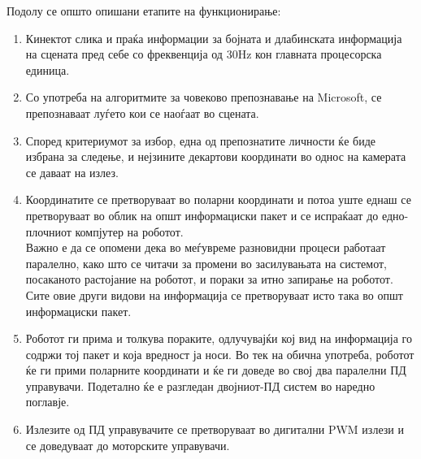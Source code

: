 \documentclass[12pt]{article}
\begin{document}
    Подолу се општо опишани етапите на функционирање:
    \renewcommand{\theenumii}{\arabic{enumii}}
    \renewcommand{\theenumiii}{\arabic{enumiii}}
    \begin{enumerate}
      \item Кинектот слика и праќа информации за бојната и длабинската информација на сцената пред себе со фреквенција од 30Hz кон главната процесорска единица.
      \item Со употреба на алгоритмите за човеково препознавање на Microsoft, се препознаваат луѓето кои се наоѓаат во сцената.
      \item Според критериумот за избор, една од препознатите личности ќе биде избрана за следење, и нејзините декартови координати во однос на камерата се даваат на излез.
      \item Координатите се претворуваат во поларни координати и потоа уште еднаш се претворуваат во облик на општ информациски пакет и се испраќаат до едно-плочниот компјутер на роботот.
      \\
      Важно е да се опомени дека во меѓувреме разновидни процеси работаат паралелно, како што се читачи за промени во засилувањата на системот, посаканото растојание на роботот, и пораки за итно запирање на роботот. Сите овие други видови на информација се претворуваат исто така во општ информациски пакет.
      \item Роботот ги прима и толкува пораките, одлучувајќи кој вид на информација го содржи тој пакет и која вредност ја носи. Во тек на обична употреба, роботот ќе ги прими поларните координати и ќе ги доведе во свој два паралелни ПД управувачи. Подетално ќе е разгледан двојниот-ПД систем во наредно поглавје.
      \item Излезите од ПД управувачите се претворуваат во дигитални PWM излези и се доведуваат до моторските управувачи.
    \end{enumerate}
\end{document}
